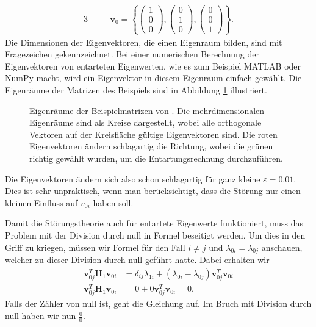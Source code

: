 \begin{alignat}{3}
    \quad
    && \bm v_0 = \left\{
    \begin{pmatrix}
        1\\
        0\\
        0
    \end{pmatrix},
    \begin{pmatrix}
        0\\
        1\\
        0
    \end{pmatrix},
    \begin{pmatrix}
        0\\
        0\\
        1
    \end{pmatrix}
    \right\}. \label{ew:eq:entartung_bsp}
\end{alignat}
Die Dimensionen der Eigenvektoren, die einen Eigenraum bilden, sind mit Fragezeichen gekennzeichnet.
Bei einer numerischen Berechnung der Eigenvektoren von entarteten Eigenwerten, wie es zum Beispiel MATLAB oder NumPy macht, wird ein Eigenvektor in diesem Eigenraum einfach gewählt.
Die Eigenräume der Matrizen des Beispiels sind in Abbildung \ref{ew:fig:entartung} illustriert.
\begin{figure}
    \begin{center}
        
    \end{center}
    \caption{
        Eigenräume der Beispielmatrizen von .
        Die mehrdimensionalen Eigenräume sind als Kreise dargestellt, wobei alle orthogonale Vektoren auf der Kreisfläche gültige Eigenvektoren sind.
        Die roten Eigenvektoren ändern schlagartig die Richtung, wobei die grünen richtig gewählt wurden, um die Entartungsrechnung durchzuführen.
        }
    \label{ew:fig:entartung}
\end{figure}
Die Eigenvektoren ändern sich also schon schlagartig für ganz kleine $\varepsilon = 0.01$.
Dies ist sehr unpraktisch, wenn man berücksichtigt, dass die Störung nur einen kleinen Einfluss auf $v_{0i}$ haben soll.

Damit die Störungstheorie auch für entartete Eigenwerte funktioniert, muss das Problem mit der Division durch null in Formel  beseitigt werden.
Um dies in den Griff zu kriegen, müssen wir Formel  für den Fall $i \neq j$ und $\lambda_{0i} = \lambda_{0j}$ anschauen, welcher zu dieser Division durch null geführt hatte.
Dabei erhalten wir
\begin{align}
    \bm v_{0j}^T \bm H_1 \bm v_{0i}
    &=
    \delta_{ij} \lambda_{1i} +
    ( \lambda_{0i} - \lambda_{0j} )
    \bm v_{0j}^T  \bm v_{0i} \nonumber
    \\
    \bm v_{0j}^T \bm H_1 \bm v_{0i}
    &=
    0 +
    0
    \bm v_{0j}^T  \bm v_{0i}
    = 0.
\end{align}
Falls der Zähler von  null ist, geht die Gleichung auf.
Im Bruch mit Division durch null haben wir nun $\frac{0}{0}$.

